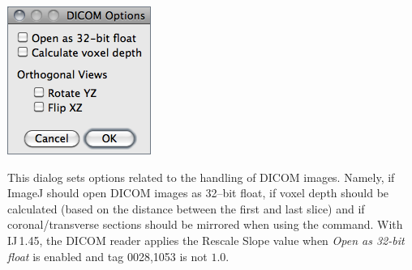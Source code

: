 \begin{minipage}[c][1\totalheight][t]{0.27\columnwidth}%
\includegraphics[scale=0.55]{images/DICOMoptions}%
\end{minipage}%
\begin{minipage}[c][1\totalheight][t]{0.73\columnwidth}%
This dialog sets options related to the handling of DICOM
images. Namely, if ImageJ should open DICOM images as 32--bit float,
if voxel depth should be calculated (based on the distance between
the first and last slice) and if coronal/transverse sections should
be mirrored when using the 
command. With IJ\,1.45, the DICOM reader applies the Rescale Slope
value when \emph{Open as 32-bit float} is enabled and tag 0028,1053
is not $1.0$. 


%
\end{minipage}


\subsubsection{\protect{}\label{sub:Misc...}}

